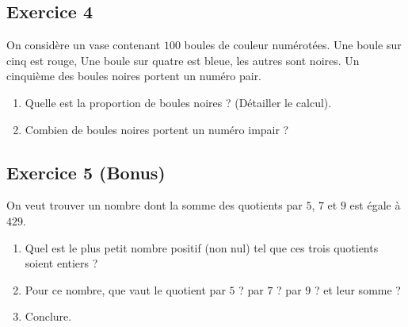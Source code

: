 \documentclass[14 pt]{extarticle}
\theoremstyle{plain}
\begin{document}
\subsection*{Exercice 4}

On considère un vase contenant $100$ boules de couleur numérotées. Une boule sur cinq est rouge, Une boule sur quatre est bleue, les autres sont noires. Un cinquième des boules noires portent un numéro pair. 

\begin{enumerate}
\item Quelle est la proportion de boules noires ? (Détailler le calcul). 
\item Combien de boules noires portent un numéro impair ? 
\end{enumerate}


\subsection*{Exercice 5 (Bonus)}
On veut trouver un nombre dont la somme des quotients par $5$, $7$ et $9$ est égale à $429$. \begin{enumerate}
\item Quel est le plus petit nombre positif (non nul) tel que ces trois quotients soient entiers ? 
\item Pour ce nombre, que vaut le quotient par $5$ ? par $7$ ? par $9$ ? et leur somme ? 
\item Conclure. 
\end{enumerate}


 	
\end{document}
